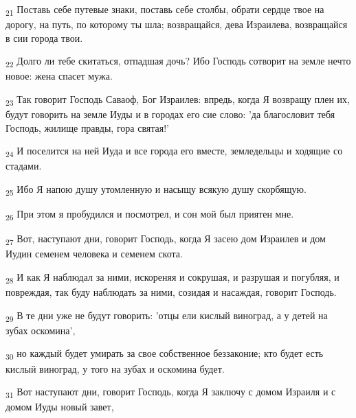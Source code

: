 \begin{tcolorbox}
\textsubscript{21} Поставь себе путевые знаки, поставь себе столбы, обрати сердце твое на дорогу, на путь, по которому ты шла; возвращайся, дева Израилева, возвращайся в сии города твои.
\end{tcolorbox}
\begin{tcolorbox}
\textsubscript{22} Долго ли тебе скитаться, отпадшая дочь? Ибо Господь сотворит на земле нечто новое: жена спасет мужа.
\end{tcolorbox}
\begin{tcolorbox}
\textsubscript{23} Так говорит Господь Саваоф, Бог Израилев: впредь, когда Я возвращу плен их, будут говорить на земле Иуды и в городах его сие слово: 'да благословит тебя Господь, жилище правды, гора святая!'
\end{tcolorbox}
\begin{tcolorbox}
\textsubscript{24} И поселится на ней Иуда и все города его вместе, земледельцы и ходящие со стадами.
\end{tcolorbox}
\begin{tcolorbox}
\textsubscript{25} Ибо Я напою душу утомленную и насыщу всякую душу скорбящую.
\end{tcolorbox}
\begin{tcolorbox}
\textsubscript{26} При этом я пробудился и посмотрел, и сон мой был приятен мне.
\end{tcolorbox}
\begin{tcolorbox}
\textsubscript{27} Вот, наступают дни, говорит Господь, когда Я засею дом Израилев и дом Иудин семенем человека и семенем скота.
\end{tcolorbox}
\begin{tcolorbox}
\textsubscript{28} И как Я наблюдал за ними, искореняя и сокрушая, и разрушая и погубляя, и повреждая, так буду наблюдать за ними, созидая и насаждая, говорит Господь.
\end{tcolorbox}
\begin{tcolorbox}
\textsubscript{29} В те дни уже не будут говорить: 'отцы ели кислый виноград, а у детей на зубах оскомина',
\end{tcolorbox}
\begin{tcolorbox}
\textsubscript{30} но каждый будет умирать за свое собственное беззаконие; кто будет есть кислый виноград, у того на зубах и оскомина будет.
\end{tcolorbox}
\begin{tcolorbox}
\textsubscript{31} Вот наступают дни, говорит Господь, когда Я заключу с домом Израиля и с домом Иуды новый завет,
\end{tcolorbox}

